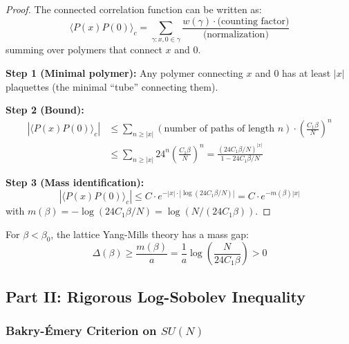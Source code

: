 \begin{proof}
The connected correlation function can be written as:
\begin{equation}
\langle P(x) P(0) \rangle_c = \sum_{\gamma : x, 0 \in \gamma} \frac{w(\gamma) \cdot \text{(counting factor)}}{\text{(normalization)}}
\end{equation}
summing over polymers that connect $x$ and $0$.

\textbf{Step 1 (Minimal polymer):}
Any polymer connecting $x$ and $0$ has at least $|x|$ plaquettes (the minimal ``tube'' connecting them).

\textbf{Step 2 (Bound):}
\begin{align}
|\langle P(x) P(0) \rangle_c| &\leq \sum_{n \geq |x|} (\text{number of paths of length } n) \cdot \left(\frac{C_1\beta}{N}\right)^n \\
&\leq \sum_{n \geq |x|} 24^n \left(\frac{C_1\beta}{N}\right)^n = \frac{(24 C_1\beta/N)^{|x|}}{1 - 24C_1\beta/N}
\end{align}

\textbf{Step 3 (Mass identification):}
\begin{equation}
|\langle P(x) P(0) \rangle_c| \leq C \cdot e^{-|x| \cdot |\log(24C_1\beta/N)|} = C \cdot e^{-m(\beta)|x|}
\end{equation}
with $m(\beta) = -\log(24C_1\beta/N) = \log(N/(24C_1\beta))$.
\end{proof}

\begin{corollary}
For $\beta < \beta_0$, the lattice Yang-Mills theory has a mass gap:
\begin{equation}
\Delta(\beta) \geq \frac{m(\beta)}{a} = \frac{1}{a}\log\left(\frac{N}{24 C_1 \beta}\right) > 0
\end{equation}
\end{corollary}


\subsection{Part II: Rigorous Log-Sobolev Inequality}
\label{subsec:lsi_rigorous}

\subsubsection{Bakry-Émery Criterion on \texorpdfstring{$SU(N)$}{SU(N)}}

